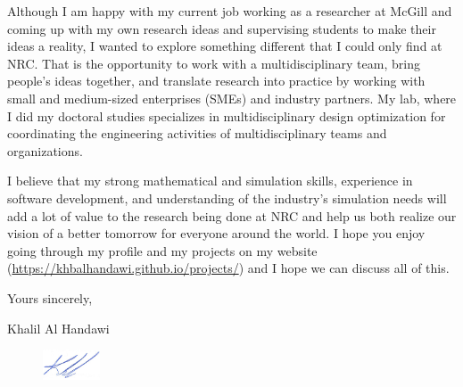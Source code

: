 \documentclass[12pt]{article} %
\begin{document}
\medskip %

Although I am happy with my current job working as a researcher at McGill and coming up with my own research ideas and supervising students to make their ideas a reality, I wanted to explore something different that I could only find at NRC. That is the opportunity to work with a multidisciplinary team, bring people's ideas together, and translate research into practice by working with small and medium-sized enterprises (SMEs) and industry partners. My lab, where I did my doctoral studies specializes in multidisciplinary design optimization for coordinating the engineering activities of multidisciplinary teams and organizations.

\medskip %

I believe that my strong mathematical and simulation skills, experience in software development, and understanding of the industry's simulation needs will add a lot of value to the research being done at NRC and help us both realize our vision of a better tomorrow for everyone around the world. I hope you enjoy going through my profile and my projects on my website (\href{https://khbalhandawi.github.io/projects/}{https://khbalhandawi.github.io/projects/}) and I hope we can discuss all of this.

\medskip %

Yours sincerely,

\medskip %

Khalil Al Handawi

\begin{figure}[h]
	\includegraphics[width=0.15\textwidth]{Signiture.png}
\end{figure}

\medskip %

\end{document}
